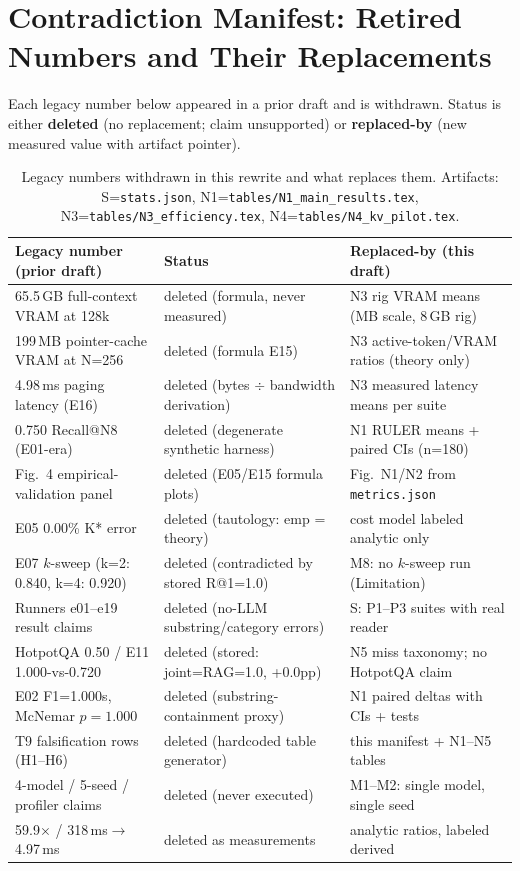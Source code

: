\section{Contradiction Manifest: Retired Numbers and Their Replacements}
\label{sec:contradiction-manifest}

Each legacy number below appeared in a prior draft and is withdrawn.
Status is either \textbf{deleted} (no replacement; claim unsupported) or \textbf{replaced-by} (new measured value with artifact pointer).

\begin{table}[h]
\centering
\caption{Legacy numbers withdrawn in this rewrite and what replaces them. Artifacts: S=\texttt{stats.json}, N1=\texttt{tables/N1\_main\_results.tex}, N3=\texttt{tables/N3\_efficiency.tex}, N4=\texttt{tables/N4\_kv\_pilot.tex}.}
\label{tab:contradiction-manifest}
\begin{tabular}{lll}
\hline
Legacy number (prior draft) & Status & Replaced-by (this draft) \\
\hline
65.5\,GB full-context VRAM at 128k & deleted (formula, never measured) & N3 rig VRAM means (MB scale, 8\,GB rig) \\
199\,MB pointer-cache VRAM at N=256 & deleted (formula E15) & N3 active-token/VRAM ratios (theory only) \\
4.98\,ms paging latency (E16) & deleted (bytes $\div$ bandwidth derivation) & N3 measured latency means per suite \\
0.750 Recall@N8 (E01-era) & deleted (degenerate synthetic harness) & N1 RULER means + paired CIs (n=180) \\
Fig.~4 empirical-validation panel & deleted (E05/E15 formula plots) & Fig.~N1/N2 from \texttt{metrics.json} \\
E05 0.00\% K* error & deleted (tautology: emp = theory) & cost model labeled analytic only \\
E07 $k$-sweep (k=2: 0.840, k=4: 0.920) & deleted (contradicted by stored R@1=1.0) & M8: no $k$-sweep run (Limitation) \\
Runners e01--e19 result claims & deleted (no-LLM substring/category errors) & S: P1--P3 suites with real reader \\
HotpotQA 0.50 / E11 1.000-vs-0.720 & deleted (stored: joint=RAG=1.0, +0.0pp) & N5 miss taxonomy; no HotpotQA claim \\
E02 F1=1.000s, McNemar $p=1.000$ & deleted (substring-containment proxy) & N1 paired deltas with CIs + tests \\
T9 falsification rows (H1--H6) & deleted (hardcoded table generator) & this manifest + N1--N5 tables \\
4-model / 5-seed / profiler claims & deleted (never executed) & M1--M2: single model, single seed \\
59.9$\times$ / 318\,ms$\rightarrow$4.97\,ms & deleted as measurements & analytic ratios, labeled derived \\
\hline
\end{tabular}
\end{table}
